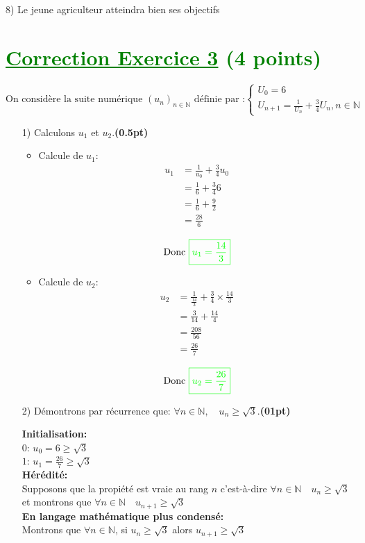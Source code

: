 \documentclass[12pt]{article}
\begin{document}
8) Le jeune agriculteur atteindra bien ses objectifs
\section*{\textcolor{green}{\underline{Correction Exercice 3} (4 points) }}
\[
\text{On considère la suite numérique } (u_n)_{n \in \mathbb{N}} \text{ définie par :}
\begin{cases}
U_{0}=6\\
U_{n+1}=\frac{1}{U_{n}}+\frac{3}{4}U_{n}, n\in\mathbb{N}
\end{cases}
\]
\begin{enumerate}
\item[1)] Calculons \( u_1 \) et \( u_2 \).\hfill\textbf{(0.5pt)}
\begin{itemize}
\item Calcule de $u_{1}$:
\begin{align*}
u_{1}&=\frac{1}{u_{0}}+\frac{3}{4}u_{0}\\
		 &=\frac{1}{6}+\frac{3}{4}6\\
		 &=\frac{1}{6}+\frac{9}{2}\\
		 &=\frac{28}{6}\\
\end{align*}
\[\text{Donc }\textcolor{green}{\boxed{u_{1}=\frac{14}{3}}}\]
\item Calcule de $u_{2}$: 
\begin{align*}
u_{2}&=\frac{1}{\frac{14}{3}}+\frac{3}{4}\times\frac{14}{3}\\
		 &=\frac{3}{14}+\frac{14}{4}\\
		 &=\frac{208}{56}\\
		 &=\frac{26}{7}\\
\end{align*}
\[\text{Donc }\textcolor{green}{\boxed{u_{2}=\frac{26}{7}}}\]
\end{itemize}
\item[2)] Démontrons par récurrence que: \( \forall n\in\mathbb{N},\quad u_n \geq \sqrt{3} \).\hfill\textbf{(01pt)}

\textbf{Initialisation:} \\
 $0$: $u_{0}=6\geq \sqrt{3}$\\
 $1$: $u_{1}=\frac{26}{7}\geq \sqrt{3}$\\
\textbf{Hérédité:} \\
Supposons que la propiété est vraie au rang $n$ c'est-à-dire \( \forall n \in \mathbb{N}\quad u_{n} \geq \sqrt{3} \) et montrons que \( \forall n \in \mathbb{N}\quad u_{n+1} \geq \sqrt{3} \)\\
\textbf{En langage mathématique plus condensé:}\\
Montrons que \( \forall n \in \mathbb{N}\), si \(u_{n} \geq \sqrt{3}\) alors \(u_{n+1} \geq \sqrt{3}\)


\end{enumerate}
\end{document}
